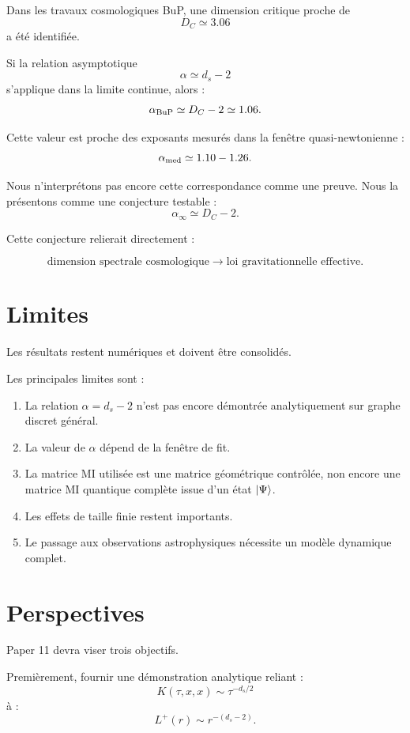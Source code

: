 \documentclass[11pt,a4paper]{article}
\begin{document}
Dans les travaux cosmologiques BuP, une dimension critique proche de
\[
D_C\simeq3.06
\]
a été identifiée.

Si la relation asymptotique
\[
\alpha\simeq d_s-2
\]
s'applique dans la limite continue, alors :
\[
\alpha_{\rm BuP}
\simeq
D_C-2
\simeq
1.06.
\]

Cette valeur est proche des exposants mesurés dans la fenêtre quasi-newtonienne :
\[
\alpha_{\rm med}\simeq1.10-1.26.
\]

Nous n'interprétons pas encore cette correspondance comme une preuve. Nous la
présentons comme une conjecture testable :
\[
\boxed{
\alpha_\infty
\simeq
D_C-2.
}
\]

Cette conjecture relierait directement :

\[
\text{dimension spectrale cosmologique}
\longrightarrow
\text{loi gravitationnelle effective}.
\]

\section{Limites}

Les résultats restent numériques et doivent être consolidés.

Les principales limites sont :

\begin{enumerate}
\item La relation \(\alpha=d_s-2\) n'est pas encore démontrée analytiquement sur
graphe discret général.
\item La valeur de \(\alpha\) dépend de la fenêtre de fit.
\item La matrice MI utilisée est une matrice géométrique contrôlée, non encore
une matrice MI quantique complète issue d'un état \(\ket{\Psi}\).
\item Les effets de taille finie restent importants.
\item Le passage aux observations astrophysiques nécessite un modèle dynamique
complet.
\end{enumerate}

\section{Perspectives}

Paper 11 devra viser trois objectifs.

Premièrement, fournir une démonstration analytique reliant :
\[
K(\tau,x,x)
\sim
\tau^{-d_s/2}
\]
à :
\[
L^{+}(r)
\sim
r^{-(d_s-2)}.
\]
\end{document}
